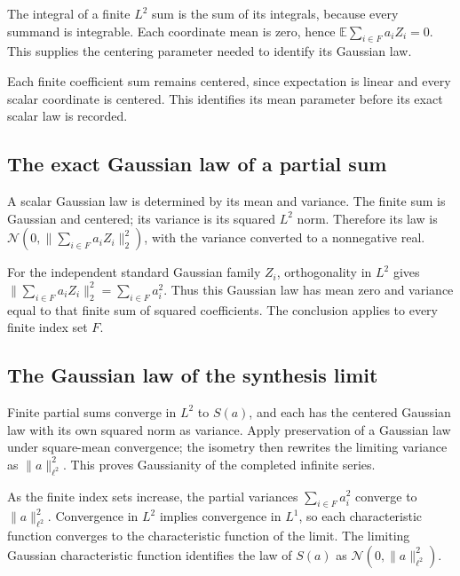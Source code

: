\documentclass[11pt,a4paper]{article}
\begin{document}
The integral of a finite \(L^2\) sum is the sum of its integrals, because every summand is integrable. Each coordinate mean is zero, hence \(\mathbb E\sum_{i\in F}a_iZ_i=0\). This supplies the centering parameter needed to identify its Gaussian law.



Each finite coefficient sum remains centered, since expectation is linear and every scalar coordinate is centered. This identifies its mean parameter before its exact scalar law is recorded.


\subsection{\texorpdfstring{The exact Gaussian law of a partial sum}{The exact Gaussian law of a partial sum}}


A scalar Gaussian law is determined by its mean and variance. The finite sum is Gaussian and centered; its variance is its squared \(L^2\) norm. Therefore its law is \(\mathcal N(0,\|\sum_{i\in F}a_iZ_i\|_2^2)\), with the variance converted to a nonnegative real.



For the independent standard Gaussian family \(Z_i\), orthogonality in \(L^2\) gives \(\|\sum_{i\in F}a_iZ_i\|_2^2=\sum_{i\in F}a_i^2\). Thus this Gaussian law has mean zero and variance equal to that finite sum of squared coefficients. The conclusion applies to every finite index set \(F\).


\subsection{\texorpdfstring{The Gaussian law of the synthesis limit}{The Gaussian law of the synthesis limit}}


Finite partial sums converge in \(L^2\) to \(S(a)\), and each has the centered Gaussian law with its own squared norm as variance. Apply preservation of a Gaussian law under square-mean convergence; the isometry then rewrites the limiting variance as \(\|a\|_{\ell^2}^2\). This proves Gaussianity of the completed infinite series.



As the finite index sets increase, the partial variances \(\sum_{i\in F}a_i^2\) converge to \(\|a\|_{\ell^2}^2\). Convergence in \(L^2\) implies convergence in \(L^1\), so each characteristic function converges to the characteristic function of the limit. The limiting Gaussian characteristic function identifies the law of \(S(a)\) as \(\mathcal N(0,\|a\|_{\ell^2}^2)\).
\end{document}
